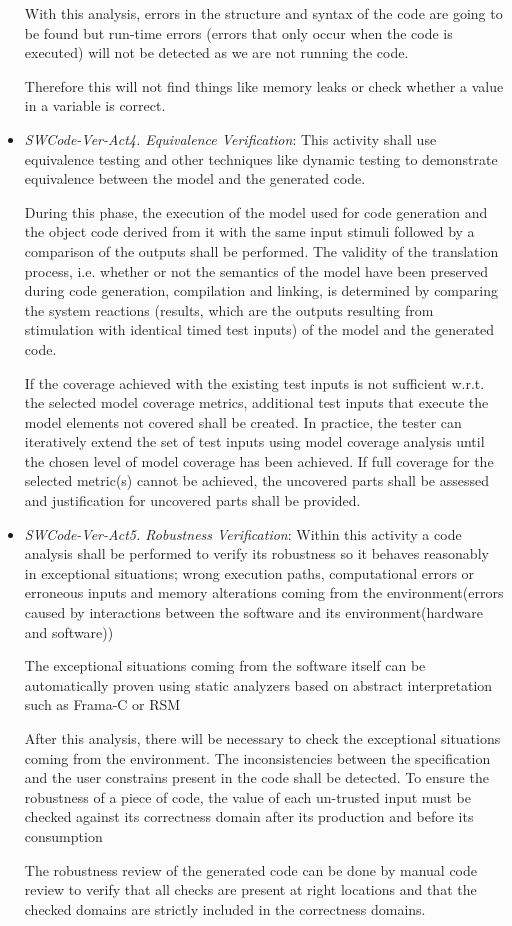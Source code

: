 \begin{itemize}
With this analysis, errors in the structure and syntax of the code are
going to be found but run-time errors (errors that only occur when the
code is executed) will not be detected as we are not running the code.

Therefore this will not find things like memory leaks or check whether
a value in a variable is correct.

\item {\it SWCode-Ver-Act4. Equivalence Verification}: This activity
  shall use equivalence testing and other techniques like dynamic
  testing to demonstrate equivalence between the model and the
  generated code.
 
  During this phase, the execution of the model used for code
  generation and the object code derived from it with the same input
  stimuli followed by a comparison of the outputs shall be
  performed. The validity of the translation process, i.e. whether or
  not the semantics of the model have been preserved during code
  generation, compilation and linking, is determined by comparing the
  system reactions (results, which are the outputs resulting from
  stimulation with identical timed test inputs) of the model and the
  generated code.

  If the coverage achieved with the existing test inputs is not
  sufficient w.r.t. the selected model coverage metrics, additional
  test inputs that execute the model elements not covered shall be
  created. In practice, the tester can iteratively extend the set of
  test inputs using model coverage analysis until the chosen level of
  model coverage has been achieved. If full coverage for the selected
  metric(s) cannot be achieved, the uncovered parts shall be assessed
  and justification for uncovered parts shall be provided.
\item {\it SWCode-Ver-Act5. Robustness Verification}: Within this
  activity a code analysis shall be performed to verify its robustness
  so it behaves reasonably in exceptional situations; wrong execution
  paths, computational errors or erroneous inputs and memory
  alterations coming from the environment(errors caused by
  interactions between the software and its environment(hardware and
  software))

  The exceptional situations coming from the software itself can be
  automatically proven using static analyzers based on abstract
  interpretation such as Frama-C or RSM

  After this analysis, there will be necessary to check the
  exceptional situations coming from the environment. The
  inconsistencies between the specification and the user constrains
  present in the code shall be detected. To ensure the robustness of a
  piece of code, the value of each un-trusted input must be checked
  against its correctness domain after its production and before its
  consumption

  The robustness review of the generated code can be done by manual
  code review to verify that all checks are present at right locations
  and that the checked domains are strictly included in the
  correctness domains.
\end{itemize}

